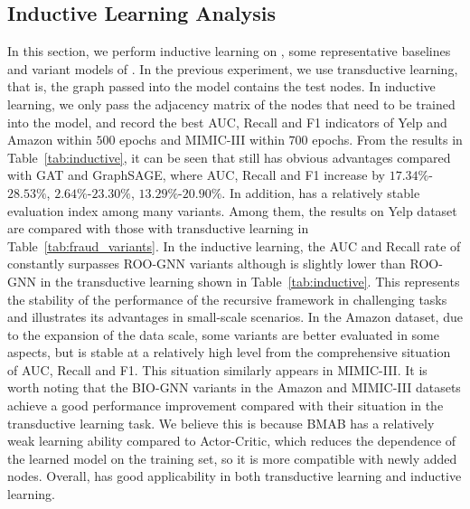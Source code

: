 \subsection{Inductive Learning Analysis}\label{sec:inductive}
In this section, we perform inductive learning on \RioGNN, some representative baselines and variant models of \RioGNN.
In the previous experiment, we use transductive learning, that is, the graph passed into the model contains the test nodes. 
In inductive learning, we only pass the adjacency matrix of the nodes that need to be trained into the model, and record the best AUC, Recall and F1 indicators of Yelp and Amazon within $500$ epochs and MIMIC-III within $700$ epochs.
From the results in Table~\ref{tab:inductive}, it can be seen that \RioGNN still has obvious advantages compared with GAT and GraphSAGE, where AUC, Recall and F1 increase by $17.34\%$-$28.53\%$, $2.64\%$-$23.30\%$, $13.29\%$-$20.90\%$.
In addition, \RioGNN has a relatively stable evaluation index among many variants. 
Among them, the results on Yelp dataset are compared with those with transductive learning in Table~\ref{tab:fraud_variants}.
In the inductive learning, the AUC and Recall rate of \RioGNN constantly surpasses ROO-GNN variants although \RioGNN is slightly lower than ROO-GNN in the transductive learning shown in Table~\ref{tab:inductive}.
This represents the stability of the performance of the recursive framework in challenging tasks and illustrates its advantages in small-scale scenarios.
In the Amazon dataset, due to the expansion of the data scale, some variants are better evaluated in some aspects, but \RioGNN is stable at a relatively high level from the comprehensive situation of AUC, Recall and F1. 
This situation similarly appears in MIMIC-III. 
It is worth noting that the BIO-GNN variants in the Amazon and MIMIC-III datasets achieve a good performance improvement compared with their situation in the transductive learning task. 
We believe this is because BMAB has a relatively weak learning ability compared to Actor-Critic, which reduces the dependence of the learned model on the training set, so it is more compatible with newly added nodes.
Overall, \RioGNN has good applicability in both transductive learning and inductive learning.




